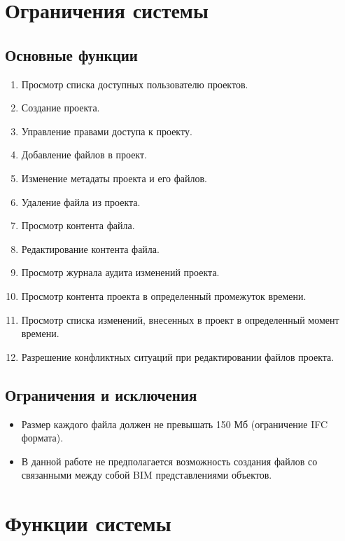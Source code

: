 \documentclass[a4paper,14pt]{extreport} %
\begin{document}
\newpage
\section{Ограничения системы}
\subsection{Основные функции}

\begin{enumerate}
\item Просмотр списка доступных пользователю проектов.
\item Создание проекта.
\item Управление правами доступа к проекту.
\item Добавление файлов в проект.
\item Изменение метадаты проекта и его файлов.
\item Удаление файла из проекта.
\item Просмотр контента файла.
\item Редактирование контента файла.
\item Просмотр журнала аудита изменений проекта.
\item Просмотр контента проекта в определенный промежуток времени.
\item Просмотр списка изменений, внесенных в проект в определенный момент времени.
\item Разрешение конфликтных ситуаций при редактировании файлов проекта.
\end {enumerate}

\subsection{Ограничения и исключения}

\begin{itemize}
\item Размер каждого файла должен не превышать 150 Мб (ограничение IFC формата).
\item В данной работе не предполагается возможность создания файлов со связанными между собой BIM представлениями объектов.
\end {itemize}

\newpage

\section{Функции системы}
\end{document}
